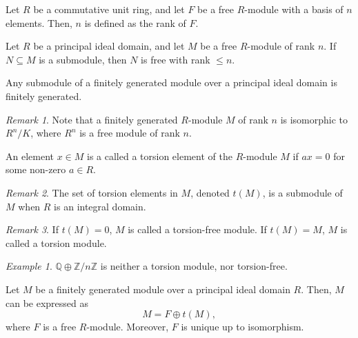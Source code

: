 \documentclass[11pt]{article}
\newcommand{\Q}{\mathbb{Q}}
\newcommand{\Z}{\mathbb{Z}}
\theoremstyle{definition}
\theoremstyle{remark}
\newtheorem*{remark}{Remark}
\newtheorem*{example}{Example}
\numberwithin{equation}{section}
\begin{document}
    \begin{definition}
        Let $R$ be a commutative unit ring, and let $F$ be a free $R$-module with a
        basis of $n$ elements. Then, $n$ is defined as the rank of $F$.
    \end{definition}

    \begin{lemma}
        Let $R$ be a principal ideal domain, and let $M$ be a free $R$-module of rank
        $n$. If $N \subseteq M$ is a submodule, then $N$ is free with rank $\leq n$.
    \end{lemma}

    \begin{corollary}
        Any submodule of a finitely generated module over a principal ideal domain is
        finitely generated.
        \begin{remark}
            Note that a finitely generated $R$-module $M$ of rank $n$ is isomorphic
            to $R^n/K$, where $R^n$ is a free module of rank $n$.
        \end{remark}
    \end{corollary}


    \begin{definition}
        An element $x \in M$ is a called a torsion element of the $R$-module $M$ if
        $ax = 0$ for some non-zero $a \in R$.
        \begin{remark}
            The set of torsion elements in $M$, denoted $t(M)$, is a submodule of
            $M$ when $R$ is an integral domain.
        \end{remark}
        \begin{remark}
            If $t(M) = 0$, $M$ is called a torsion-free module. If $t(M) = M$, $M$ is
            called a torsion module.
        \end{remark}
    \end{definition}

    \begin{example}
        $\Q\oplus \Z/n\Z$ is neither a torsion module, nor torsion-free.
    \end{example}


    \begin{theorem}
        Let $M$ be a finitely generated module over a principal ideal domain $R$.
        Then, $M$ can be expressed as \[
            M = F\oplus t(M),
        \] where $F$ is a free $R$-module. Moreover, $F$ is unique up to isomorphism.
    \end{theorem}
\end{document}
